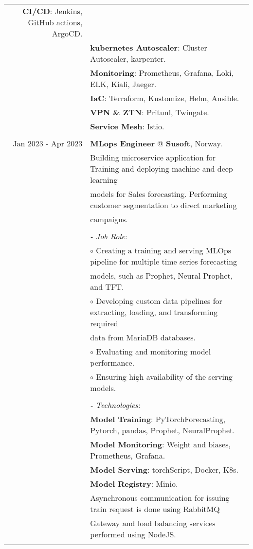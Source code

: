 \documentclass[a4paper,10pt]{article}
\begin{document}
\begin{longtable}{r|l}
    \textbf{CI/CD}: Jenkins, GitHub actions, ArgoCD. \\&
    \textbf{kubernetes Autoscaler}: Cluster Autoscaler, karpenter. \\&
    \textbf{Monitoring}: Prometheus, Grafana, Loki, ELK, Kiali, Jaeger. \\&
    \textbf{IaC}: Terraform, Kustomize, Helm, Ansible.\\&
    \textbf{VPN \& ZTN}: Pritunl, Twingate. \\&
    \textbf{Service Mesh}: Istio. \\&
    \\
    Jan 2023 - Apr 2023 & \textbf{MLops Engineer} @
    \textbf{Susoft}, Norway. \\& 
    Building microservice application for Training and deploying machine and deep learning \\& models for Sales forecasting. 
    Performing customer segmentation to direct marketing \\& campaigns. \\&
    \\&
    \textit{- Job Role}:\\&
    $\circ$ Creating a training and serving MLOps pipeline for multiple time series 
    forecasting \\ & models, such as Prophet, Neural Prophet, and TFT. \\ &
    $\circ$ Developing custom data pipelines for extracting, loading, and transforming  
    required \\ & data from MariaDB databases. \\ &
    $\circ$ Evaluating and monitoring model performance. \\ &
    $\circ$ Ensuring high availability of the serving models. \\ &
    \\&
    \textit{- Technologies}:\\&
     \textbf{Model Training}: PyTorchForecasting, Pytorch, pandas, Prophet, NeuralProphet. \\&
     \textbf{Model Monitoring}: Weight and biases, Prometheus, Grafana.\\&
     \textbf{Model Serving}: torchScript, Docker, K8s. \\&
     \textbf{Model Registry}: Minio. \\&
    Asynchronous communication for issuing train request is done using RabbitMQ \\&
    Gateway and load balancing services performed using NodeJS. \\&

\end{longtable}
\end{document}
